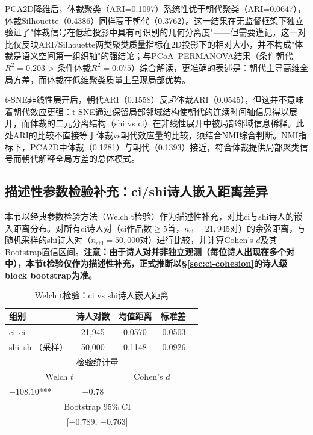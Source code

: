 \documentclass[12pt,a4paper]{article}
\numberwithin{equation}{section}
\begin{document}
PCA2D降维后，体裁聚类（ARI=0.1097）系统性优于朝代聚类（ARI=0.0647），体裁Silhouette（0.4386）同样高于朝代（0.3762）。这一结果在无监督框架下独立验证了"体裁信号在低维投影中具有可识别的几何分离度"——但需要谨记，这一对比仅反映ARI/Silhouette两类聚类质量指标在2D投影下的相对大小，并不构成"体裁是语义空间第一组织轴"的强结论；与PCoA--PERMANOVA结果（条件朝代$R^{2}=0.203$ > 条件体裁$R^{2}=0.075$）综合解读，更准确的表述是：朝代主导高维全局方差，而体裁在低维聚类质量上呈现局部优势。

t-SNE非线性展开后，朝代ARI（0.1558）反超体裁ARI（0.0545），但这并不意味着朝代效应更强：t-SNE通过保留局部邻域结构使朝代的连续时间轴信息得以展开，而体裁的二元分离结构（shi vs ci）在非线性展开中被局部邻域信息稀释。此处ARI的比较不直接等于体裁vs朝代效应量的比较，须结合NMI综合判断。NMI指标下，PCA2D中体裁（0.1281）与朝代（0.1393）接近，符合体裁提供局部聚类信号而朝代解释全局方差的总体模式。

\subsection{描述性参数检验补充：ci/shi诗人嵌入距离差异}
\label{sec:exp-ttest}

本节以经典参数检验方法（Welch t检验）作为描述性补充，对比ci与shi诗人的嵌入距离分布。对所有ci诗人对（ci作品数$\ge$5首，$n_{\text{ci}}=21{,}945$对）的余弦距离，与随机采样的shi诗人对（$n_{\text{shi}}=50{,}000$对）进行比较，并计算Cohen's $d$及其Bootstrap置信区间。\textbf{注意：由于诗人对并非独立观测（每位诗人出现在多个对中），本节t检验仅作为描述性补充，正式推断以§\ref{sec:ci-cohesion}的诗人级block bootstrap为准。}

\begin{table}[htbp]
  \centering
  \caption{Welch t检验：ci vs shi诗人嵌入距离}
  \label{tab:ttest}
  \begin{tabular}{lccrc}
    \toprule
    组别            & 诗人对数   & 均值距离 & 标准差 \\
    \midrule
    ci--ci          & 21,945    & 0.0570  & 0.0503 \\
    shi--shi（采样）& 50,000    & 0.1148  & 0.0926 \\
    \midrule
    \multicolumn{4}{c}{检验统计量} \\
    \midrule
    \multicolumn{2}{c}{Welch $t$} & \multicolumn{2}{c}{Cohen's $d$} \\
    $-108.10$***   &  $-0.78$  \\
    \midrule
    \multicolumn{4}{c}{Bootstrap 95\% CI} \\
    \midrule
    \multicolumn{4}{c}{[$-0.789$, $-0.763$]} \\
    \bottomrule
  \end{tabular}
\end{table}
\end{document}
